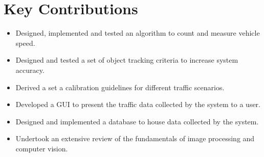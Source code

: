 \section{Key Contributions}


\begin{itemize}
    \item Designed, implemented and tested an algorithm to count and measure vehicle speed.
    \item Designed and tested a set of object tracking criteria to increase system accuracy.
    \item Derived a set a calibration guidelines for different traffic scenarios.
    \item Developed a GUI to present the traffic data collected by the system to a user.
    \item Designed and implemented a database to house data collected by the system.
    \item Undertook an extensive review of the fundamentals of image processing and computer vision.  
\end{itemize}